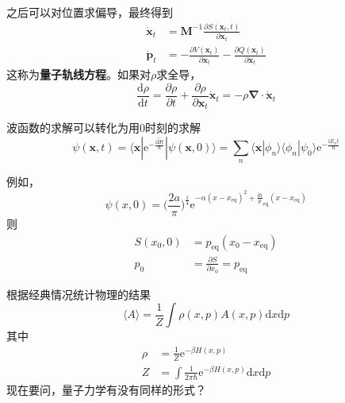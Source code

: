 \documentclass[12pt]{article}
\begin{document}
    之后可以对位置求偏导，最终得到
    \begin{equation}\begin{aligned}
        \dot{\bm{x}}_t &= \bm{M}^{-1} \frac {\partial S(\bm{x}_t,t)}{\partial \bm{x}_t}\\
        \dot{\bm{p}}_t &= -\frac {\partial V(\bm{x}_t)}{\partial \bm{x}_t} - \frac {\partial Q(\bm{x}_t)}{\partial \bm{x}_t}
    \end{aligned}\end{equation}
    这称为\textbf{量子轨线方程}。如果对$\rho$求全导，
    \begin{equation}
        \frac {\mathrm{d}\rho}{\mathrm{d}t} = \frac {\partial \rho}{\partial t} + \frac {\partial \rho}{\partial \bm{x}_t} \dot{\bm{x}}_t = -\rho \bm{\nabla} \cdot \dot{\bm{x}}_t
    \end{equation}

    波函数的求解可以转化为用0时刻的求解
    \begin{equation}
        \psi(\bm{x},t) = \langle \bm{x} | \mathrm{e}^{-\frac {\mathrm{i}\hat{H}t}{\hbar}} | \psi(\bm{x},0) \rangle = \sum_n \langle \bm{x}|\phi_n \rangle \langle \phi_n |\psi_0 \rangle \mathrm{e}^{-\frac {\mathrm{i}E_n t}{\hbar}}
    \end{equation}

    例如，
    \begin{equation}
        \psi(x,0) =  \bigg(\frac {2a}{\pi}\bigg)^{\frac 14} \mathrm{e}^{-\alpha (x - x_{\mathrm{eq}})^2 +\frac {\mathrm{i}{\hbar}} p_{\mathrm{eq}}(x - x_\mathrm{eq})}
    \end{equation}
    则
    \begin{equation}\begin{aligned}
        S(x_0,0) &= p_\mathrm{eq} (x_0 - x_\mathrm{eq})\\
        p_0 &= \frac {\partial S}{\partial x_0} = p_\mathrm{eq}
    \end{aligned}\end{equation}

    根据经典情况统计物理的结果
    \begin{equation}
        \langle A \rangle =\frac 1Z \int \rho(x,p)A(x,p) \mathrm{d}x\mathrm{d}p
    \end{equation}
    其中 
    \begin{equation}\begin{aligned}
        \rho &= \frac 1Z \mathrm{e}^{-\beta H(x,p)}\\
        Z &= \int \frac 1{2\pi \hbar} \mathrm{e}^{-\beta H(x,p)} \mathrm{d}x \mathrm{d}p
    \end{aligned}\end{equation}
    现在要问，量子力学有没有同样的形式？
\end{document}
